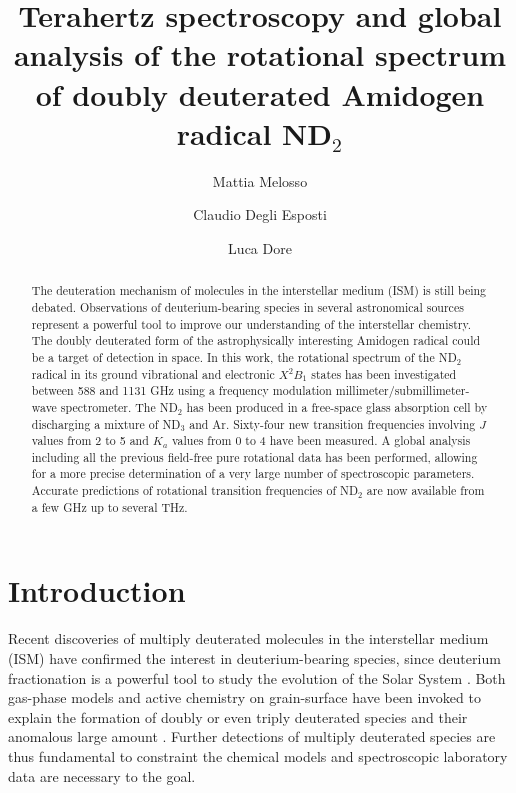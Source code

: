 \documentclass[twocolumn]{aastex61}
\begin{document}
\title{Terahertz spectroscopy and global analysis of the rotational spectrum of doubly deuterated Amidogen radical ND$_{2}$}

\author{Mattia {Melosso}}
\author{Claudio Degli Esposti}
\author{Luca Dore}


\begin{abstract}
The deuteration mechanism of molecules in the interstellar medium (ISM) is still being debated. Observations of deuterium-bearing
 species in several astronomical sources represent a powerful tool to improve our understanding of the interstellar chemistry.
 The doubly deuterated form of the astrophysically interesting Amidogen radical could be a target of detection in space.
 In this work, the rotational spectrum of the ND$_{2}$ radical in its ground vibrational and electronic $X^{2}B_{1}$ states has been 
 investigated between 588 and 1131 GHz using a frequency modulation millimeter/submillimeter-wave spectrometer.
 The ND$_{2}$ has been produced in a free-space glass absorption cell by discharging a mixture of ND$_{3}$ and Ar.
 Sixty-four new transition frequencies involving $J$ values from 2 to 5 and $K_{a}$ values from 0 to 4 have been measured.
 A global analysis including all the previous field-free pure rotational data has been performed, allowing  for a more precise 
 determination of a very large number of spectroscopic parameters.
Accurate predictions of rotational transition frequencies of ND$_{2}$ are now available from a few GHz up to several THz.
\end{abstract}


\section{Introduction}
Recent discoveries of multiply deuterated molecules in the interstellar medium (ISM) \citep{Cec98, Lis02, Vas03, Par04} have confirmed 
the interest in deuterium-bearing species, since deuterium fractionation is a powerful tool to study the evolution of the Solar System
 \citep{Mil02, San02, Rou03}.
Both gas-phase models and active chemistry on grain-surface have been invoked to explain the formation of doubly or even triply 
deuterated species and their anomalous large amount \citep{Rob00, Cas02,Rob03}.
Further detections of multiply deuterated species are thus fundamental to constraint the chemical models and spectroscopic laboratory data are 
necessary to the goal.
\end{document}
